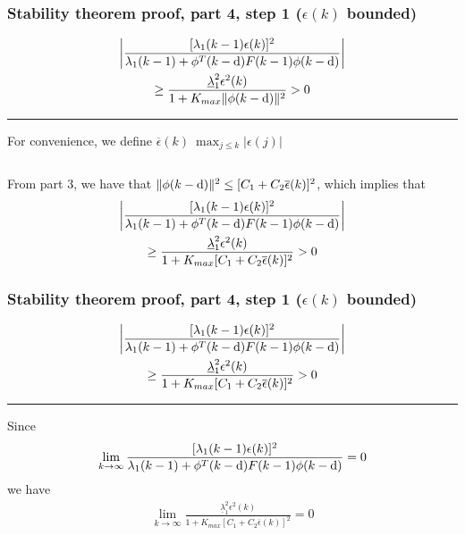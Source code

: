 \begin{frame}
    \frametitle{Stability theorem proof, part 4, step 1 ($\epsilon(k)$ bounded)}
    
    \begin{multline*}
        \left| \frac{ [\lambda_1(k-1) \epsilon(k)]^2 }
            { \lambda_1(k-1) + \phi^T(k-\textrm{d}) F(k-1) \phi(k-\textrm{d}) } \right| \\
        \geq \frac{ \underline{\lambda}_1^2 \epsilon^2(k) }{ 1 + K_{max} \| \phi(k-\textrm{d}) \|^2 } > 0
    \end{multline*}
    \hrule{\hfill}

    For convenience, we define $\displaystyle \overline{\epsilon}(k) \ \max_{j\leq k} |\epsilon(j)|$
    \pause
    
    $\, $
    
    From part 3, we have that $\| \phi(k-\textrm{d}) \|^2 \leq [C_1 + C_2 \overline{\epsilon}(k)]^2$, which implies that
    \begin{multline*}
        \left| \frac{ [\lambda_1(k-1) \epsilon(k)]^2 }
            { \lambda_1(k-1) + \phi^T(k-\textrm{d}) F(k-1) \phi(k-\textrm{d}) } \right| \\
        \geq \frac{ \underline{\lambda}_1^2 \epsilon^2(k) }{ 1 + K_{max} [C_1 + C_2 \overline{\epsilon}(k)]^2 } > 0
    \end{multline*}    

    
\end{frame} 

\begin{frame}
    \frametitle{Stability theorem proof, part 4, step 1 ($\epsilon(k)$ bounded)}

    \begin{multline*}
        \left| \frac{ [\lambda_1(k-1) \epsilon(k)]^2 }
            { \lambda_1(k-1) + \phi^T(k-\textrm{d}) F(k-1) \phi(k-\textrm{d}) } \right| \\
        \geq \frac{ \underline{\lambda}_1^2 \epsilon^2(k) }{ 1 + K_{max} [C_1 + C_2 \overline{\epsilon}(k)]^2 } > 0
    \end{multline*}
    \hrule{\hfill}
        
    Since 
    \begin{align*}
        \lim_{k \rightarrow \infty} \frac{ [\lambda_1(k-1) \epsilon(k)]^2 }
            { \lambda_1(k-1) + \phi^T(k-\textrm{d}) F(k-1) \phi(k-\textrm{d}) } = 0
    \end{align*}
    we have
    \begin{align*}
        \lim_{k \rightarrow \infty} \frac{ \underline{\lambda}_1^2 \epsilon^2(k) }
            { 1 + K_{max} [C_1 + C_2 \overline{\epsilon}(k)]^2 } = 0
    \end{align*}

\end{frame} 

